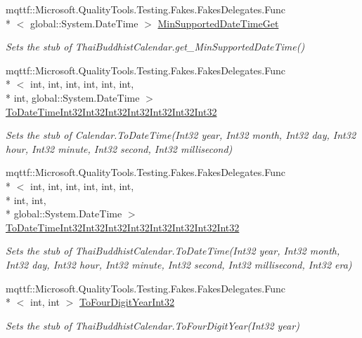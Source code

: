 \begin{DoxyCompactItemize}
mqttf\-::\-Microsoft.\-Quality\-Tools.\-Testing.\-Fakes.\-Fakes\-Delegates.\-Func\\*
$<$ global\-::\-System.\-Date\-Time $>$ \hyperlink{class_system_1_1_globalization_1_1_fakes_1_1_stub_thai_buddhist_calendar_a5ec14abdf230698a2366e0c4974d7ac8}{Min\-Supported\-Date\-Time\-Get}
\begin{DoxyCompactList}\small\item\em Sets the stub of Thai\-Buddhist\-Calendar.\-get\-\_\-\-Min\-Supported\-Date\-Time()\end{DoxyCompactList}\item 
mqttf\-::\-Microsoft.\-Quality\-Tools.\-Testing.\-Fakes.\-Fakes\-Delegates.\-Func\\*
$<$ int, int, int, int, int, int, \\*
int, global\-::\-System.\-Date\-Time $>$ \hyperlink{class_system_1_1_globalization_1_1_fakes_1_1_stub_thai_buddhist_calendar_a2665b8befef1aea17df3a35ac51f6ea5}{To\-Date\-Time\-Int32\-Int32\-Int32\-Int32\-Int32\-Int32\-Int32}
\begin{DoxyCompactList}\small\item\em Sets the stub of Calendar.\-To\-Date\-Time(\-Int32 year, Int32 month, Int32 day, Int32 hour, Int32 minute, Int32 second, Int32 millisecond)\end{DoxyCompactList}\item 
mqttf\-::\-Microsoft.\-Quality\-Tools.\-Testing.\-Fakes.\-Fakes\-Delegates.\-Func\\*
$<$ int, int, int, int, int, int, \\*
int, int, \\*
global\-::\-System.\-Date\-Time $>$ \hyperlink{class_system_1_1_globalization_1_1_fakes_1_1_stub_thai_buddhist_calendar_a1899b8b1593bbb3780f272899efd5cd2}{To\-Date\-Time\-Int32\-Int32\-Int32\-Int32\-Int32\-Int32\-Int32\-Int32}
\begin{DoxyCompactList}\small\item\em Sets the stub of Thai\-Buddhist\-Calendar.\-To\-Date\-Time(\-Int32 year, Int32 month, Int32 day, Int32 hour, Int32 minute, Int32 second, Int32 millisecond, Int32 era)\end{DoxyCompactList}\item 
mqttf\-::\-Microsoft.\-Quality\-Tools.\-Testing.\-Fakes.\-Fakes\-Delegates.\-Func\\*
$<$ int, int $>$ \hyperlink{class_system_1_1_globalization_1_1_fakes_1_1_stub_thai_buddhist_calendar_a35e71ee372eb0c66b664f4fd1f90faa1}{To\-Four\-Digit\-Year\-Int32}
\begin{DoxyCompactList}\small\item\em Sets the stub of Thai\-Buddhist\-Calendar.\-To\-Four\-Digit\-Year(\-Int32 year)\end{DoxyCompactList}\item 

\end{DoxyCompactItemize}
